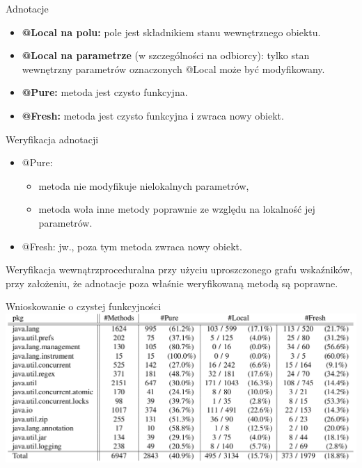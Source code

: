 \documentclass{beamer}
\begin{document}
\begin{frame}{Adnotacje}
  \begin{itemize}
    \item \textbf{{\color{annot} @Local} na polu:} pole jest
      składnikiem stanu wewnętrznego obiektu.
    \item \textbf{{\color{annot} @Local} na parametrze} (w
      szczególności na odbiorcy): tylko stan wewnętrzny parametrów
      oznaczonych {\color{annot} @Local} może być modyfikowany.
    \item \textbf{{\color{annot} @Pure}:} metoda jest czysto funkcyjna.
    \item \textbf{{\color{annot} @Fresh}:} metoda jest czysto funkcyjna
      i zwraca nowy obiekt.
  \end{itemize}
\end{frame}

\begin{frame}{Weryfikacja adnotacji}
  \begin{itemize}
    \item {\color{annot} @Pure}:
      \begin{itemize}
        \item metoda nie modyfikuje nielokalnych parametrów, 
        \item metoda woła inne metody poprawnie ze względu na
          lokalność jej parametrów.
      \end{itemize}
    \item {\color{annot} @Fresh}: jw., poza tym metoda zwraca nowy
      obiekt.
  \end{itemize}
  \pause
  Weryfikacja wewnątrzproceduralna przy użyciu uproszczonego grafu
  wskaźników, przy założeniu, że adnotacje poza właśnie weryfikowaną
  metodą są poprawne.
\end{frame}

\begin{frame}{Wnioskowanie o czystej funkcyjności}
  \includegraphics[width=\columnwidth]{img/experiment.png}
\end{frame}
\end{document}
